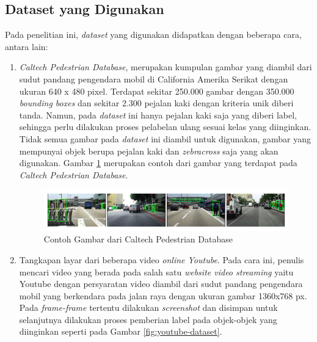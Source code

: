 \documentclass[conference]{IEEEtran}
\begin{document}
	\subsection{Dataset yang Digunakan}
	\vspace{1ex}
	Pada penelitian ini, \textit{dataset} yang digunakan didapatkan dengan beberapa cara, antara lain:
	\begin{enumerate}
		\item \textit{Caltech Pedestrian Database}, merupakan kumpulan gambar yang diambil dari sudut pandang pengendara mobil di California Amerika Serikat dengan ukuran 640 x 480 pixel. Terdapat sekitar 250.000 gambar dengan 350.000 \textit{bounding boxes} dan sekitar 2.300 pejalan kaki dengan kriteria unik diberi tanda. Namun, pada \textit{dataset} ini hanya pejalan kaki saja yang diberi label, sehingga perlu dilakukan proses pelabelan ulang sesuai kelas yang diinginkan. Tidak semua gambar pada \textit{dataset} ini diambil untuk digunakan, gambar yang mempunyai objek berupa pejalan kaki dan \textit{zebracross} saja yang akan digunakan. Gambar \ref{fig:caltech} merupakan contoh dari gambar yang terdapat pada \textit{Caltech Pedestrian Database}.
		\begin{figure}[h]
			\centering
			\includegraphics[scale=0.25]{img/caltech.png}
			\caption{Contoh Gambar dari Caltech Pedestrian Database}
			\label{fig:caltech}
		\end{figure} 
		
		\item Tangkapan layar dari beberapa video \textit{online Youtube}. Pada cara ini, penulis mencari video yang berada pada salah satu \textit{website video streaming} yaitu Youtube dengan persyaratan video diambil dari sudut pandang pengendara mobil yang berkendara pada jalan raya dengan ukuran gambar 1360x768 px. Pada \textit{frame-frame} tertentu dilakukan \textit{screenshot} dan disimpan untuk selanjutnya dilakukan proses pemberian label pada objek-objek yang diinginkan seperti pada Gambar \ref{fig:youtube-dataset}. 
		

\end{enumerate}
\end{document}
